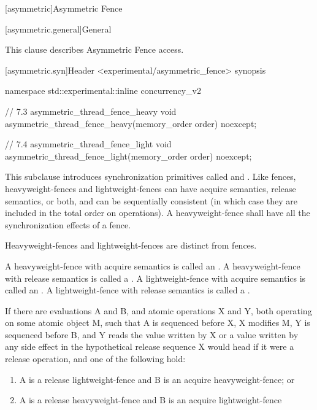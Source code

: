 
[asymmetric]{Asymmetric Fence}

[asymmetric.general]{General}

This clause describes Asymmetric Fence access. 


[asymmetric.syn]{Header <experimental/asymmetric_fence> synopsis}


\begin{codeblock}
namespace std::experimental::inline concurrency_v2 {

// 7.3 asymmetric_thread_fence_heavy
void asymmetric_thread_fence_heavy(memory_order order) noexcept;

// 7.4 asymmetric_thread_fence_light
void asymmetric_thread_fence_light(memory_order order) noexcept;
}
\end{codeblock}


This subclause introduces synchronization primitives called  and
. Like fences, heavyweight-fences and lightweight-fences can have acquire
semantics, release semantics, or both, and can be sequentially consistent (in which case they
are included in the total order  on  operations).
A heavyweight-fence shall have all the
synchronization effects of a fence. %
\begin{note}  Heavyweight-fences and
lightweight-fences are distinct from fences.\end{note}

A heavyweight-fence with acquire semantics is called an . A
heavyweight-fence with release semantics is called a . A
lightweight-fence with acquire semantics is called an . A
lightweight-fence with release semantics is called a .

If there are evaluations A and B, and atomic operations X and Y, both operating on some atomic
object M, such that A is sequenced before X, X modifies M, Y is sequenced before B, and Y
reads the value written by X or a value written by any side effect in the hypothetical release
sequence X would head if it were a release operation, and one of the following hold:
\begin{enumerate}
    \item  A is a release lightweight-fence and B is an acquire heavyweight-fence; or
\item  A is a release heavyweight-fence and B is an acquire lightweight-fence
\end{enumerate}

